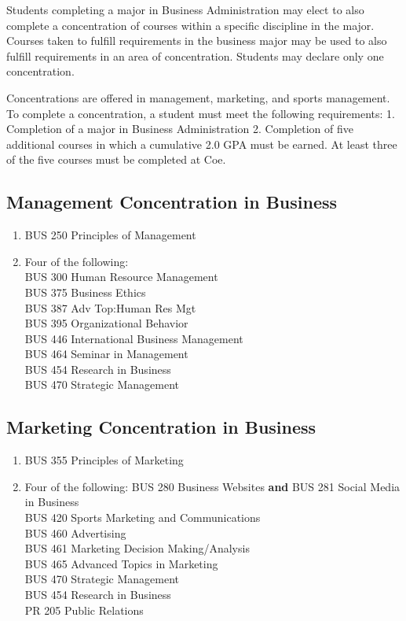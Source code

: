 \documentclass[
  letterpaper,
]{scrbook}
\providecommand{\tightlist}{%
  \setlength{\itemsep}{0pt}\setlength{\parskip}{0pt}}
\begin{document}
Students completing a major in Business Administration may elect to also
complete a concentration of courses within a specific discipline in the
major. Courses taken to fulfill requirements in the business major may
be used to also fulfill requirements in an area of concentration.
Students may declare only one concentration.

Concentrations are offered in management, marketing, and sports
management. To complete a concentration, a student must meet the
following requirements: 1. Completion of a major in Business
Administration 2. Completion of five additional courses in which a
cumulative 2.0 GPA must be earned. At least three of the five courses
must be completed at Coe.

\subsection{Management Concentration in
Business}\label{management-concentration-in-business}

\begin{enumerate}
\def\labelenumi{\arabic{enumi}.}
\tightlist
\item
  BUS 250 Principles of Management
\item
  Four of the following:\\
  BUS 300 Human Resource Management\\
  BUS 375 Business Ethics\\
  BUS 387 Adv Top:Human Res Mgt\\
  BUS 395 Organizational Behavior\\
  BUS 446 International Business Management\\
  BUS 464 Seminar in Management\\
  BUS 454 Research in Business\\
  BUS 470 Strategic Management
\end{enumerate}

\subsection{Marketing Concentration in
Business}\label{marketing-concentration-in-business}

\begin{enumerate}
\def\labelenumi{\arabic{enumi}.}
\tightlist
\item
  BUS 355 Principles of Marketing\\
\item
  Four of the following: BUS 280 Business Websites \textbf{and} BUS 281
  Social Media in Business\\
  BUS 420 Sports Marketing and Communications\\
  BUS 460 Advertising\\
  BUS 461 Marketing Decision Making/Analysis\\
  BUS 465 Advanced Topics in Marketing\\
  BUS 470 Strategic Management\\
  BUS 454 Research in Business\\
  PR 205 Public Relations
\end{enumerate}
\end{document}
